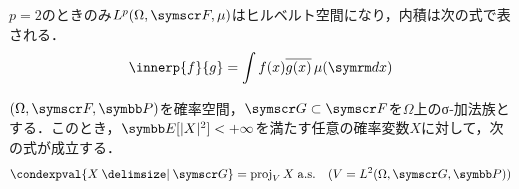 \documentclass[../../main]{subfiles}
\begin{document}
\begin{proposition}{}{}
  \(p=2\)のときのみ\(\Lebesgue{p}(\Omega,\sigmaalg{F},\mu)\)はヒルベルト空間になり，内積は次の式で表される．
  \[
    \innerp{f}{g} = \int f(x)\conj*{g(x)}\measured[x]{\mu}
  \]
\end{proposition}

\begin{proposition}{}{}
  \((\Omega,\sigmaalg{F},\prob)\)を確率空間，\(\sigmaalg{G}\subset\sigmaalg{F}\)を\(\Omega\)上のσ‐加法族とする．このとき，\(\expval[\abs{X}^2]<+\infty\)を満たす任意の確率変数\(X\)に対して，次の式が成立する．
  \[
    \condexpval{X\given\sigmaalg{G}} = \proj_VX\almostsurely\quad(V=\Lebesgue{2}(\Omega,\sigmaalg{G},\prob))
  \]
\end{proposition}
\end{document}
